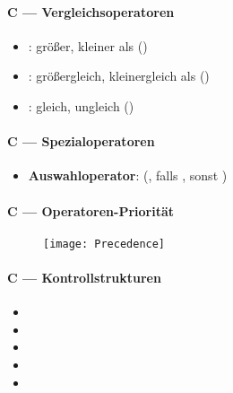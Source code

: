 \paragraph{C --- Vergleichsoperatoren}
\begin{itemize}
  \item \textbf{\code{>,<}}: größer, kleiner als ()
  \item \textbf{\code{>=,<=}}: größergleich, kleinergleich als ()
  \item \textbf{\code{==,!=}}: gleich, ungleich ()
\end{itemize}

\paragraph{C --- Spezialoperatoren}
\begin{itemize}
  \item \textbf{Auswahloperator}:  (, falls , sonst )
\end{itemize}

\paragraph{C --- Operatoren-Priorität}
\begin{figure}[ht]
  \centering
  \texttt{[image: Precedence]}
  \label{Precedence}
\end{figure}

\paragraph{C --- Kontrollstrukturen}
\begin{itemize}
  \item {}
  \item {}
  \item {}
  \item {}
  \item {}
\end{itemize}

